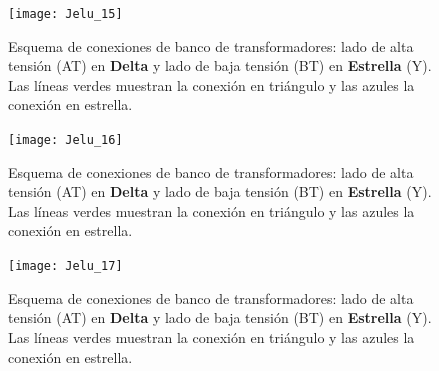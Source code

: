 \documentclass[
  11pt,
  letterpaper,
   addpoints,
  ]{exam}
\begin{document}
\begin{questions}
\begin{solution}
\begin{figure}[H]
  \centering
  \texttt{[image: Jelu\_15]}
  \caption{Esquema de conexiones de banco de transformadores: lado de alta tensión (AT) en \textbf{Delta} y lado de baja tensión (BT) en \textbf{Estrella} (Y). Las líneas verdes muestran la conexión en triángulo y las azules la conexión en estrella.}
\end{figure}


\begin{figure}[H]
  \centering
  \texttt{[image: Jelu\_16]}
  \caption{Esquema de conexiones de banco de transformadores: lado de alta tensión (AT) en \textbf{Delta} y lado de baja tensión (BT) en \textbf{Estrella} (Y). Las líneas verdes muestran la conexión en triángulo y las azules la conexión en estrella.}
\end{figure}

\begin{figure}[H]
  \centering
  \texttt{[image: Jelu\_17]}
  \caption{Esquema de conexiones de banco de transformadores: lado de alta tensión (AT) en \textbf{Delta} y lado de baja tensión (BT) en \textbf{Estrella} (Y). Las líneas verdes muestran la conexión en triángulo y las azules la conexión en estrella.}
\end{figure}
\end{solution}


\end{questions}
\end{document}
